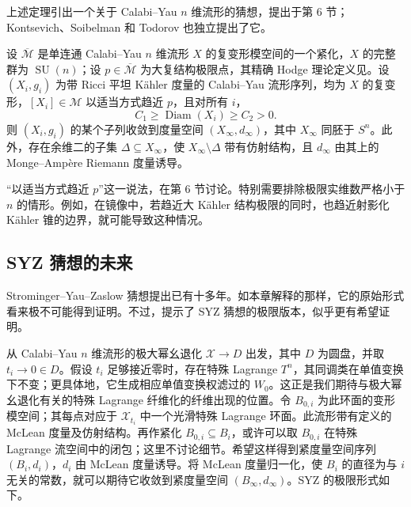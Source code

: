 上述定理引出一个关于 Calabi--Yau $n$ 维流形的猜想，提出于第 6 节；Kontsevich、Soibelman 和 Todorov 也独立提出了它。
\begin{conjecture}\label{conj:7.32}
设 $\overline{\mathcal M}$ 是单连通 Calabi--Yau $n$ 维流形 $X$ 的复变形模空间的一个紧化，$X$ 的完整群为 $\operatorname{SU}(n)$；设 $p\in\overline{\mathcal M}$ 为大复结构极限点，其精确 Hodge 理论定义见。设 $(X_i,g_i)$ 为带 Ricci 平坦 Kähler 度量的 Calabi--Yau 流形序列，均为 $X$ 的复变形，$[X_i]\in\mathcal M$ 以适当方式趋近 $p$，且对所有 $i$，
\[
C_1\geq\operatorname{Diam}(X_i)\geq C_2>0.
\]
则 $(X_i,g_i)$ 的某个子列收敛到度量空间 $(X_\infty,d_\infty)$，其中 $X_\infty$ 同胚于 $S^n$。此外，存在余维二的子集 $\Delta\subseteq X_\infty$，使 $X_\infty\setminus\Delta$ 带有仿射结构，且 $d_\infty$ 由其上的 Monge--Ampère Riemann 度量诱导。
\end{conjecture}

“以适当方式趋近 $p$”这一说法，在第 6 节讨论。特别需要排除极限实维数严格小于 $n$ 的情形。例如，在镜像中，若趋近大 Kähler 结构极限的同时，也趋近射影化 Kähler 锥的边界，就可能导致这种情况。

\subsection{SYZ 猜想的未来}\label{sec:7.3.7}

Strominger--Yau--Zaslow 猜想提出已有十多年。如本章解释的那样，它的原始形式看来极不可能得到证明。不过，提示了 SYZ 猜想的极限版本，似乎更有希望证明。

从 Calabi--Yau $n$ 维流形的极大幂幺退化 $\mathcal X\to D$ 出发，其中 $D$ 为圆盘，并取 $t_i\to0\in D$。假设 $t_i$ 足够接近零时，存在特殊 Lagrange $T^n$，其同调类在单值变换下不变；更具体地，它生成相应单值变换权滤过的 $W_0$。这正是我们期待与极大幂幺退化有关的特殊 Lagrange 纤维化的纤维出现的位置。令 $B_{0,i}$ 为此环面的变形模空间；其每点对应于 $\mathcal X_{t_i}$ 中一个光滑特殊 Lagrange 环面。此流形带有定义的 McLean 度量及仿射结构。再作紧化 $B_{0,i}\subseteq B_i$，或许可以取 $B_{0,i}$ 在特殊 Lagrange 流空间中的闭包；这里不讨论细节。希望这样得到紧度量空间序列 $(B_i,d_i)$，$d_i$ 由 McLean 度量诱导。将 McLean 度量归一化，使 $B_i$ 的直径为与 $i$ 无关的常数，就可以期待它收敛到紧度量空间 $(B_\infty,d_\infty)$。SYZ 的极限形式如下。

